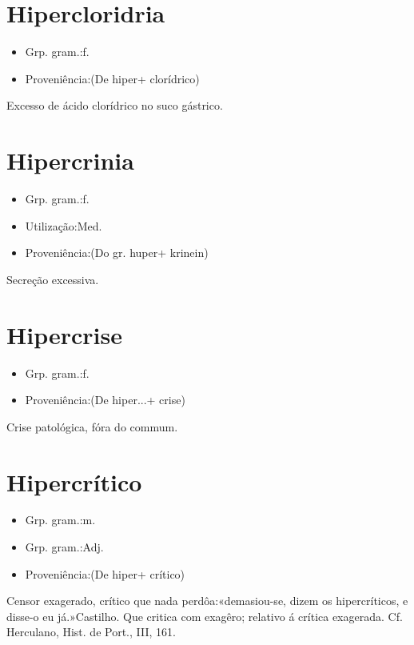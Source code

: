 \documentclass{article}
\begin{document}
\section{Hipercloridria}
\begin{itemize}
\item {Grp. gram.:f.}
\end{itemize}
\begin{itemize}
\item {Proveniência:(De \textunderscore hiper\textunderscore  + \textunderscore clorídrico\textunderscore )}
\end{itemize}
Excesso de ácido clorídrico no suco gástrico.
\section{Hipercrinia}
\begin{itemize}
\item {Grp. gram.:f.}
\end{itemize}
\begin{itemize}
\item {Utilização:Med.}
\end{itemize}
\begin{itemize}
\item {Proveniência:(Do gr. \textunderscore huper\textunderscore  + \textunderscore krinein\textunderscore )}
\end{itemize}
Secreção excessiva.
\section{Hipercrise}
\begin{itemize}
\item {Grp. gram.:f.}
\end{itemize}
\begin{itemize}
\item {Proveniência:(De \textunderscore hiper...\textunderscore  + \textunderscore crise\textunderscore )}
\end{itemize}
Crise patológica, fóra do commum.
\section{Hipercrítico}
\begin{itemize}
\item {Grp. gram.:m.}
\end{itemize}
\begin{itemize}
\item {Grp. gram.:Adj.}
\end{itemize}
\begin{itemize}
\item {Proveniência:(De \textunderscore hiper\textunderscore  + \textunderscore crítico\textunderscore )}
\end{itemize}
Censor exagerado, crítico que nada perdôa:«\textunderscore demasiou-se, dizem os hipercríticos, e disse-o eu já.\textunderscore »Castilho.
Que critica com exagêro; relativo á crítica exagerada. Cf. Herculano, \textunderscore Hist. de Port.\textunderscore , III, 161.
\end{document}

